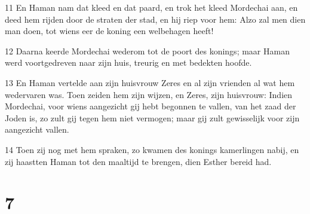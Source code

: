 \par 11 En Haman nam dat kleed en dat paard, en trok het kleed Mordechai aan, en deed hem rijden door de straten der stad, en hij riep voor hem: Alzo zal men dien man doen, tot wiens eer de koning een welbehagen heeft!
\par 12 Daarna keerde Mordechai wederom tot de poort des konings; maar Haman werd voortgedreven naar zijn huis, treurig en met bedekten hoofde.
\par 13 En Haman vertelde aan zijn huisvrouw Zeres en al zijn vrienden al wat hem wedervaren was. Toen zeiden hem zijn wijzen, en Zeres, zijn huisvrouw: Indien Mordechai, voor wiens aangezicht gij hebt begonnen te vallen, van het zaad der Joden is, zo zult gij tegen hem niet vermogen; maar gij zult gewisselijk voor zijn aangezicht vallen.
\par 14 Toen zij nog met hem spraken, zo kwamen des konings kamerlingen nabij, en zij haastten Haman tot den maaltijd te brengen, dien Esther bereid had.

\chapter{7}

